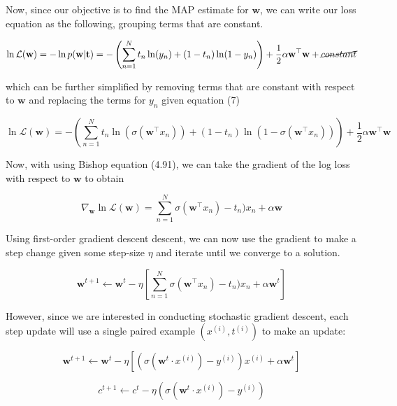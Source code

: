 \documentclass[12pt]{extarticle}
\begin{document}
Now, since our objective is to find the MAP estimate for $\mathbf{w}$, we can write our loss equation as the following, grouping terms that are constant.

\begin{equation}
    \ln \mathcal{L}(\mathbf{w}) = - \ln p(\textbf{w}|\textbf{t}) = - \left( \sum_{n=1}^N t_n\ln (y_n) + (1-t_n) \ln (1-y_n) \right) + \frac{1}{2} \alpha \mathbf{w}^\top \mathbf{w} + \cancel{constant} \\
\end{equation}

which can be further simplified by removing terms that are constant with respect to $\mathbf{w}$ and replacing the terms for $y_n$ given equation (7)

\begin{equation}
    \ln \mathcal{L}(\mathbf{w}) = - \left( \sum_{n=1}^N t_n\ln (\sigma(\textbf{w}^\top x_n)) + (1-t_n) \ln (1-\sigma(\textbf{w}^\top x_n)) \right) + \frac{1}{2} \alpha \mathbf{w}^\top \mathbf{w}
\end{equation}

Now, with using Bishop equation (4.91), we can take the gradient of the log loss with respect to $\mathbf{w}$ to obtain

\begin{equation}
     \nabla_\mathbf{w} \ln \mathcal{L}(\mathbf{w}) =  \sum_{n=1}^N \sigma(\textbf{w}^\top x_n) - t_n)x_n + \alpha \mathbf{w}
\end{equation}

Using first-order gradient descent descent, we can now use the gradient to make a step change given some step-size $\eta$ and iterate until we converge to a solution.

\begin{equation}
\mathbf{w}^{t+1} \leftarrow \mathbf{w}^{t} - \eta \left[\sum_{n=1}^N \sigma(\textbf{w}^\top x_n) - t_n)x_n + \alpha \mathbf{w}^{t} \right]
\end{equation}

However, since we are interested in conducting stochastic gradient descent, each step update will use a single paired example $(x^{(i)}, t^{(i)})$ to make an update:

\begin{equation}
\mathbf{w}^{t+1} \leftarrow \mathbf{w}^{t} - \eta \left[ \left(\sigma(\mathbf{w}^t \cdot x^{(i)}) - y^{(i)}\right) x^{(i)} + \alpha \mathbf{w}^{t} \right]
\end{equation}

\begin{equation}
c^{t+1} \leftarrow c^{t} - \eta (\sigma(\mathbf{w}^t \cdot x^{(i)}) - y^{(i)})
\end{equation}
\end{document}
